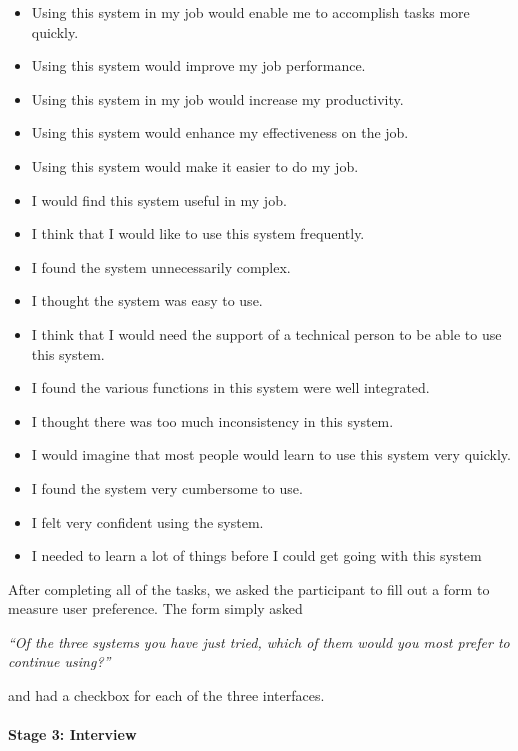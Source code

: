 {\singlespacing
\begin{itemize}
  \item Using this system in my job would enable me to accomplish tasks more quickly.
  \item Using this system would improve my job performance.
  \item Using this system in my job would increase my productivity.
  \item Using this system would enhance my effectiveness on the job.
  \item Using this system would make it easier to do my job.
\end{itemize}
}

{\singlespacing
\begin{itemize}
  \item I would find this system useful in my job.
  \item I think that I would like to use this system frequently.
  \item I found the system unnecessarily complex.
  \item I thought the system was easy to use.
  \item I think that I would need the support of a technical person to be able to use this system.
  \item I found the various functions in this system were well integrated.
  \item I thought there was too much inconsistency in this system.
  \item I would imagine that most people would learn to use this system very quickly.
  \item I found the system very cumbersome to use.
  \item I felt very confident using the system.
  \item I needed to learn a lot of things before I could get going with this system
\end{itemize}
}

After completing all of the tasks, we asked the participant to fill out a form to measure user preference. The form
simply asked

\textit{``Of the three systems you have just tried, which of them would you most prefer to continue
using?''}

and had a checkbox for each of the three interfaces.

\paragraph{Stage 3: Interview}

